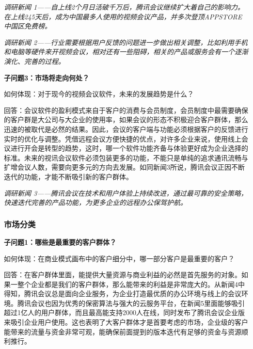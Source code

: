 \documentclass[a4paper,12pt]{article}
\begin{document}
    \textit{调研新闻 1——⾃上线2个⽉⽇活破千万后，腾讯会议继续扩⼤着⾃⼰的影响⼒。在上线245天后，成为中国最多⼈使⽤的视频会议产品，并多次登顶APPSTORE中国区免费榜。}
    

    \textit{调研新闻 2——⾏业需要根据⽤户反馈的问题进⼀步做出相关调整，⽐如利⽤⼿机和电脑等硬件来开视频会议，相对还有⼀些阻碍，相关的产品或服务会有⼀个逐渐演化、完善的过程。}
    

    
    \textbf{子问题3：市场将走向何处？}

    如何体现：对于现今的视频会议软件，未来的发展趋势是什么？

    回答：会议软件的盈利模式来⾃于客户的消费与会员制度，会员制度中最需要确保的客户群是⼤公司与⼤企业的使⽤率，如果会议的形态不积极迎合客户群体，那么迅速的被取代是必然的结果。因此，会议的客户端与功能必须根据客户的反馈进⾏实时的优化与调整。凭借远程会议方便快捷的优点，对许多企业来说，使⽤线上会议进⾏开会是转型的趋势，这时，哪⼀个软件功能⻬备与体验更好成为企业选择的标准。未来的视讯会议软件必须包装更多的功能，不能只是单纯的追求通讯流畅与扩增会议⼈数，需要向更多元的⽅向去发展。如同新闻3所说，腾讯会议正因不断迭代的功能，才能不断吸引新的客户群体。

    \textit{调研新闻 3——腾讯会议在技术和⽤户体验上持续改进，通过最可靠的安全策略，快速迭代完善的产品功能，为更多企业的远程办公保驾护航。}

    
    \subsubsection{市场分类}
    \textbf{子问题1：哪些是最重要的客户群体？}

    如何体现：在商业模式画布中的客户细分中，哪⼀部分客户是最重要的客户？

    回答：在客户群体⾥⾯，能提供⼤量资源与商业利益的必然是⾸先服务的对象。如果⼀整个企业都是我们的客户群体，那么能带来的利益是⾮常庞⼤的。从新闻4中得知，腾讯会议总是⾯向企业服务，为企业打造最优质的办公环境与线上的会议环境。腾讯会议也因为优秀的保密算法与强⼤的云服务平台，在新闻5⾥⾯能够吸引超过1亿⼈的⽤户群体，⽽且最⾼能⽀持2000⼈在线，同时发布了腾讯会议企业版来吸引企业用户使用。这也表明了⼤客户群体才是⾸要考虑的市场，企业级的客户能带来的流量与资⾦⾮常可观，能确保前⾯提到的版本迭代有足够的资⾦与资源顺利推⾏。
\end{document}

